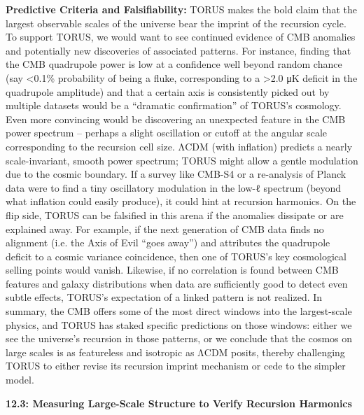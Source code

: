 \documentclass[
]{article}
\begin{document}
\textbf{Predictive Criteria and Falsifiability:} TORUS makes the bold
claim that the largest observable scales of the universe bear the
imprint of the recursion cycle. To support TORUS, we would want to see
continued evidence of CMB anomalies and potentially new discoveries of
associated patterns. For instance, finding that the CMB quadrupole power
is low at a confidence well beyond random chance (say \textless0.1\%
probability of being a fluke, corresponding to a \textgreater2.0 μK
deficit in the quadrupole amplitude) and that a certain axis is
consistently picked out by multiple datasets would be a ``dramatic
confirmation'' of TORUS's cosmology. Even more convincing would be
discovering an unexpected feature in the CMB power spectrum -- perhaps a
slight oscillation or cutoff at the angular scale corresponding to the
recursion cell size. ΛCDM (with inflation) predicts a nearly
scale-invariant, smooth power spectrum; TORUS might allow a gentle
modulation due to the cosmic boundary. If a survey like CMB-S4 or a
re-analysis of Planck data were to find a tiny oscillatory modulation in
the low-ℓ spectrum (beyond what inflation could easily produce), it
could hint at recursion harmonics. On the flip side, TORUS can be
falsified in this arena if the anomalies dissipate or are explained
away. For example, if the next generation of CMB data finds no alignment
(i.e. the Axis of Evil ``goes away'') and attributes the quadrupole
deficit to a cosmic variance coincidence, then one of TORUS's key
cosmological selling points would vanish. Likewise, if no correlation is
found between CMB features and galaxy distributions when data are
sufficiently good to detect even subtle effects, TORUS's expectation of
a linked pattern is not realized. In summary, the CMB offers some of the
most direct windows into the largest-scale physics, and TORUS has staked
specific predictions on those windows: either we see the universe's
recursion in those patterns, or we conclude that the cosmos on large
scales is as featureless and isotropic as ΛCDM posits, thereby
challenging TORUS to either revise its recursion imprint mechanism or
cede to the simpler model.

\textbf{12.3: Measuring Large-Scale Structure to Verify Recursion
Harmonics}
\end{document}

